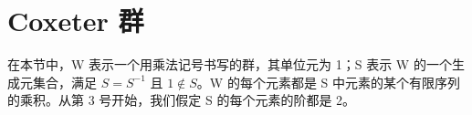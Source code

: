 \section{Coxeter 群}

在本节中，W 表示一个用乘法记号书写的群，其单位元为 1；S 表示 W 的一个生成元集合，满足 \(S = S^{-1}\) 且 \(1 \notin S\)。W 的每个元素都是 S 中元素的某个有限序列的乘积。从第 3 号开始，我们假定 S 的每个元素的阶都是 2。

